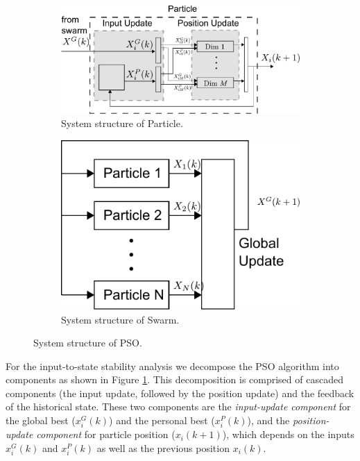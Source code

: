 \documentclass[phd]{byuprop}
\begin{document}
\begin{figure}[htbp]
	\centering
	\begin{subfigure}[t]{0.6\linewidth}
		\centering
		\includegraphics[width=\textwidth]{fig/particle_sys_flow.pdf}
		\caption{System structure of Particle.}
		\label{fig:sys:particle}
	\end{subfigure}  
	\begin{subfigure}[t]{0.37\linewidth}
		\centering
		\includegraphics[width=\textwidth]{fig/pso_sys_flow.pdf}
		\caption{System structure of Swarm.}
		\label{fig:sys:swarm}
	\end{subfigure}   
	\caption{System structure of PSO.}
	\label{fig:sys:pso}
\end{figure}

For the input-to-state stability analysis we decompose the PSO algorithm into components as shown in Figure \ref{fig:sys:particle}. 
This decomposition is comprised of cascaded components (the input update, followed by the position update) and the feedback of the historical state.
These two components are the 
\emph{input-update component} for the global best ($ x^{G}_{i}(k) $) and the personal best ($ x^{P}_{i}(k) $), and the 
\emph{position-update component} for particle position ($ x_{i}(k+1) $), which depends on the inputs $ x^{G}_{i}(k) $ and $ x^{P}_{i}(k) $ as well as the previous position $ x_{i}(k) $.
\end{document}
